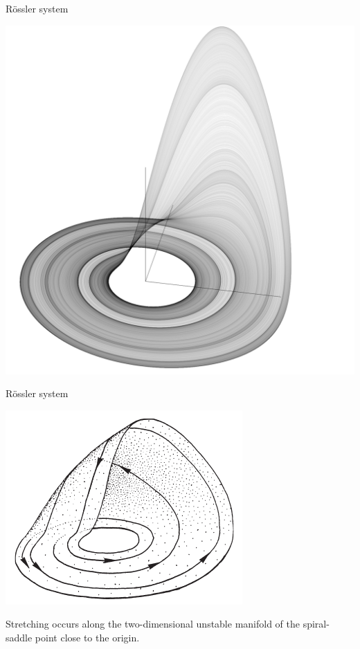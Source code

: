 \documentclass[usenames, dvipsnames, aspectratio=169]{beamer}
\begin{document}
{



  \begin{frame}[t, c]{R\"ossler system}{}
    \vfill
    \large
    \centering

    \includegraphics[width=.4\textwidth]{rossler_system}

    \vfill
  \end{frame}

  \begin{frame}[t, c]{R\"ossler system}{}
    \vfill
    \large

    \begin{minipage}{.38\textwidth}
      \centering
      \includegraphics[width=\textwidth]{rossler_schematic}
    \end{minipage}%
    \hfill
    \begin{minipage}{.58\textwidth}
      Stretching occurs along the two-dimensional unstable manifold of the spiral-saddle point close to the origin.
    \end{minipage}


\end{frame}}
\end{document}
